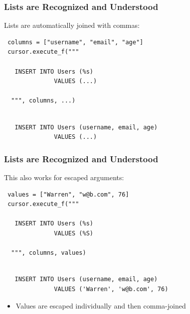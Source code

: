 \documentclass{beamer}
\begin{document}
\begin{frame}[fragile]
  \frametitle{Lists are Recognized and Understood}

  Lists are automatically joined with commas:
\begin{verbatim}
 columns = ["username", "email", "age"]
 cursor.execute_f("""

   INSERT INTO Users (%s) 
              VALUES (...)

  """, columns, ...)
\end{verbatim}

\begin{verbatim}

   INSERT INTO Users (username, email, age)
              VALUES (...)

\end{verbatim}

\end{frame}



\begin{frame}[fragile]
  \frametitle{Lists are Recognized and Understood}

  This also works for escaped arguments:
\begin{verbatim}
 values = ["Warren", "w@b.com", 76]
 cursor.execute_f("""

   INSERT INTO Users (%s) 
              VALUES (%S)

  """, columns, values)
\end{verbatim}

\begin{verbatim}

   INSERT INTO Users (username, email, age)
              VALUES ('Warren', 'w@b.com', 76)

\end{verbatim}

\begin{itemize}
\item Values are escaped individually and then comma-joined
\end{itemize}

\end{frame}
\end{document}
